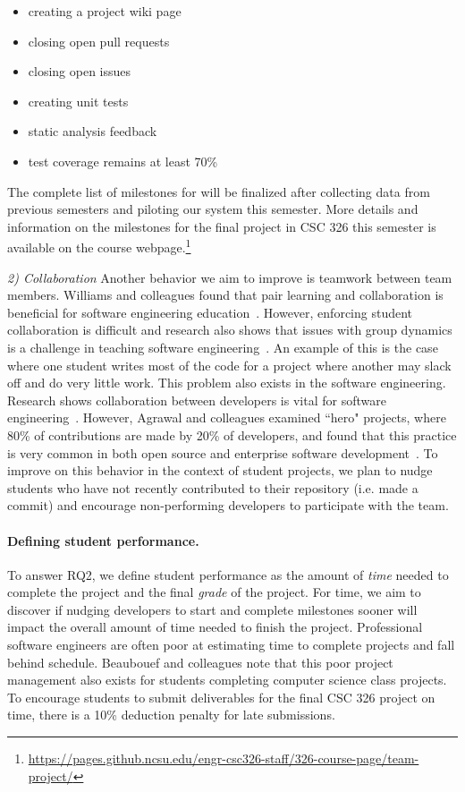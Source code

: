 \begin{itemize}
    \item creating a project wiki page
    \item closing open pull requests
    \item closing open issues
    \item creating unit tests
    \item static analysis feedback
    \item test coverage remains at least 70\%
\end{itemize}

The complete list of milestones for \TOOL will be finalized after collecting data from previous semesters and piloting our system this semester. More details and information on the milestones for the final project in CSC 326 this semester is available on the course webpage.\footnote{\url{https://pages.github.ncsu.edu/engr-csc326-staff/326-course-page/team-project/}}

\textit{2) Collaboration} Another behavior we aim to improve is teamwork between team members. Williams and colleagues found that pair learning and collaboration is beneficial for software engineering education~\cite{williams2000effects}. However, enforcing student collaboration is difficult and research also shows that issues with group dynamics is a challenge in teaching software engineering~\cite{Heckman2018Itrust}. An example of this is the case where one student writes most of the code for a project where another may slack off and do very little work. This problem also exists in the software engineering. Research shows collaboration between developers is vital for software engineering~\cite{whitehead2007collaboration}. However, Agrawal and colleagues examined ``hero" projects, where 80\% of contributions are made by 20\% of developers, and found that this practice is very common in both open source and enterprise software development~\cite{Agrawal2018Hero}. To improve on this behavior in the context of student projects, we plan to nudge students who have not recently contributed to their repository (i.e. made a commit) and encourage non-performing developers to participate with the team.

\paragraph{Defining student performance.}

To answer RQ2, we define student performance as the amount of \textit{time} needed to complete the project and the final \textit{grade} of the project. For time, we aim to discover if nudging developers to start and complete milestones sooner will impact the overall amount of time needed to finish the project. Professional software engineers are often poor at estimating time to complete projects and fall behind schedule. Beaubouef and colleagues note that this poor project management also exists for students completing computer science class projects. To encourage students to submit deliverables for the final CSC 326 project on time, there is a 10\% deduction penalty for late submissions.

